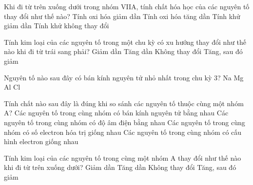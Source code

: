 \begin{ex}%
	Khi đi từ trên xuống dưới trong nhóm VIIA, tính chất hóa học của các nguyên tố thay đổi như thế nào?
	\choice
	{\True Tính oxi hóa giảm dần}
	{Tính oxi hóa tăng dần}
	{Tính khử giảm dần}
	{Tính khử không thay đổi}
\end{ex}
\begin{ex}%
	Tính kim loại của các nguyên tố trong một chu kỳ có xu hướng thay đổi như thế nào khi đi từ trái sang phải?
	\choice
	{\True Giảm dần}
	{Tăng dần}
	{Không thay đổi}
	{Tăng, sau đó giảm}
\end{ex}
\begin{ex}%
	Nguyên tố nào sau đây có bán kính nguyên tử nhỏ nhất trong chu kỳ 3?
	\choice
	{Na}
	{Mg}
	{Al}
	{\True Cl}
\end{ex}
\begin{ex}%
	Tính chất nào sau đây là đúng khi so sánh các nguyên tố thuộc cùng một nhóm A?
	\choice
	{Các nguyên tố trong cùng nhóm có bán kính nguyên tử bằng nhau}
	{Các nguyên tố trong cùng nhóm có độ âm điện bằng nhau}
	{\True Các nguyên tố trong cùng nhóm có số electron hóa trị giống nhau}
	{Các nguyên tố trong cùng nhóm có cấu hình electron giống nhau}
\end{ex}
\begin{ex}%
	Tính kim loại của các nguyên tố trong cùng một nhóm A thay đổi như thế nào khi đi từ trên xuống dưới?
	\choice
	{Giảm dần}
	{\True Tăng dần}
	{Không thay đổi}
	{Tăng, sau đó giảm}
\end{ex}
